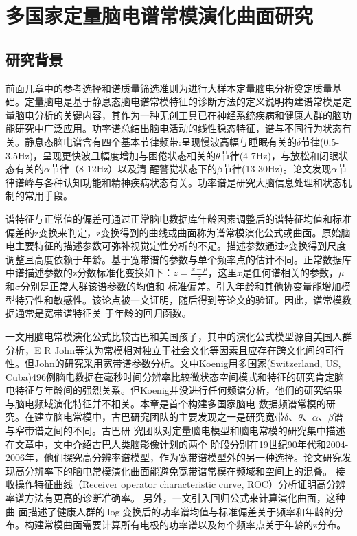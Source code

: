 \chapter{多国家定量脑电谱常模演化曲面研究}
\section{研究背景}
前面几章中的参考选择和谱质量筛选准则为进行大样本定量脑电分析奠定质量基础。定量脑电是基于静息态脑电谱常模特征的诊断方法的定义说明构建谱常模是定量脑电分析的关键内容，其作为一种无创工具已在神经系统疾病和健康人群的脑功能研究中广泛应用。功率谱总结出脑电活动的线性稳态特征，谱与不同行为状态有关。静息态脑电谱含有四个基本节律频带:呈现慢波高幅与睡眠有关的$\delta$节律(0.5-3.5Hz)，呈现更快波且幅度增加与困倦状态相关的$\theta$节律(4-7Hz)，与放松和闭眼状态有关的$\alpha$节律（8-12Hz）以及清
醒警觉状态下的$\beta$节律(13-30Hz)。论文\cite{john1988neurometrics,buzsaki2006rhythms}发现$\alpha$节律谱峰与各种认知功能和精神疾病状态有关。功率谱是研究大脑信息处理和状态机制的常用手段。

谱特征与正常值的偏差可通过正常脑电数据库年龄因素调整后的谱特征均值和标准偏差的z变换来判定，z变换得到的曲线或曲面称为谱常模演化公式或曲面。原始脑电主要特征的描述参数可弥补视觉定性分析的不足。描述参数通过z变换得到尺度调整且高度依赖于年龄。基于宽带谱的参数与单个频率点的估计不同。正常数据库中谱描述参数的z分数标准化变换如下：\(z=\frac{x-\mu}{\sigma}\)，这里$x$是任何谱相关的参数，$\mu$和$\sigma$分别是正常人群该谱参数的均值和
标准偏差。引入年龄和其他协变量能增加模型特异性和敏感性。该论点被\cite{john1980developmental}一文证明，随后得到\cite{matouvsek1973automatic,john1977neurometrics,alvarez1987eeg,amador1989structure}等论文的验证。因此，谱常模数据通常是宽带谱特征关
于年龄的回归函数。

\cite{alvarez1987eeg}一文用脑电常模演化公式比较古巴和美国孩子，其中的演化公式模型源自美国人群分析，E R John等认为常模相对独立于社会文化等因素且应存在跨文化间的可行性。但John的研究采用宽带谱参数分析。\cite{koenig2002millisecond}文中Koenig用多国家(Switzerland, US, Cuba)496例脑电数据在毫秒时间分辨率比较微状态空间模式和特征的研究肯定脑电特征与年龄间的强烈关系。但Koenig并没进行任何频谱分析，他们的研究结果与脑电频域演化特征并不相关。本章是首个构建多国家脑电
数据频谱常模的研究。在建立脑电常模中，古巴研究团队的主要发现之一是研究宽带$\delta$、$\theta$、$\alpha$、$\beta$谱与窄带谱之间的不同。古巴研
究团队对定量脑电模型和脑电常模的研究集中描述在文章\cite{hernandez-gonzalez_multimodal_2011}中，文中介绍古巴人类脑影像计划的两个
阶段分别在19世纪90年代和2004-2006年，他们探究高分辨率谱模型，作为宽带谱模型外的另一种选择。论文\cite{szava1994high}研究发现高分辨率下的脑电常模演化曲面能避免宽带谱常模在频域和空间上的混叠。 接收操作特征曲线（Receiver operator characteristic curve, ROC）分析证明高分辨率谱方法有更高的诊断准确率。 另外，\cite{amador1990spatiotemporal}一文引入回归公式来计算演化曲面，这种曲
面描述了健康人群的$\log$变换后的功率谱均值与标准偏差关于频率和年龄的分布。构建常模曲面需要计算所有电极的功率谱以及每个频率点关于年龄的z分布。

